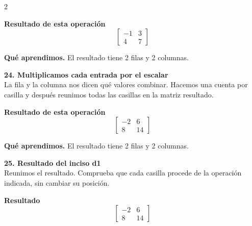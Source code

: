 \documentclass[11pt,a4paper,landscape]{article}
\begin{document}
\begin{multicols*}{2}
\begin{minipage}{\linewidth}
\par\smallskip \textbf{Resultado de esta operación}\[\begin{bmatrix}-1 & 3\\4 & 7\end{bmatrix}\]
\par\smallskip\textbf{Qué aprendimos.} El resultado tiene 2 filas y 2 columnas.
\end{minipage}\par\medskip
\noindent\begin{minipage}{\linewidth}\textbf{24. Multiplicamos cada entrada por el escalar}\\[2pt]La fila y la columna nos dicen qué valores combinar. Hacemos una cuenta por casilla y después reunimos todas las casillas en la matriz resultado.
\par{}\par\smallskip
\par\smallskip \textbf{Resultado de esta operación}\[\begin{bmatrix}-2 & 6\\8 & 14\end{bmatrix}\]
\par\smallskip\textbf{Qué aprendimos.} El resultado tiene 2 filas y 2 columnas.
\end{minipage}\par\medskip
\noindent\begin{minipage}{\linewidth}\textbf{25. Resultado del inciso d1}\\[2pt]Reunimos el resultado. Comprueba que cada casilla procede de la operación indicada, sin cambiar su posición.
\par\smallskip \textbf{Resultado}\[\begin{bmatrix}-2 & 6\\8 & 14\end{bmatrix}\]

\end{minipage}
\end{multicols*}
\end{document}
